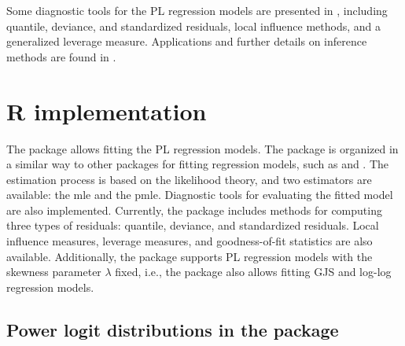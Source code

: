 Some diagnostic tools for the PL regression models are presented in \cite{QueirozFerrari2023}, including quantile, deviance, and standardized residuals, local influence methods, and a generalized leverage measure. Applications and further details on inference methods are found in \cite{QueirozFerrari2023}. 


\section[R code]{R implementation} \label{sec:implementation}

The  package allows fitting the PL regression models. The package is organized in a similar way to other packages for fitting regression models, such as  and . The estimation process is based on the likelihood theory, and two estimators are available: the mle and the pmle. Diagnostic tools for evaluating the fitted model are also implemented. Currently, the package includes methods for computing three types of residuals: quantile, deviance, and standardized residuals. Local influence measures, leverage measures, and goodness-of-fit statistics are also available. Additionally, the package supports PL regression models with the skewness parameter $\lambda$ fixed, i.e., the package also allows
fitting GJS and log-log regression models. 

\subsection[R code]{Power logit distributions in the  package}

